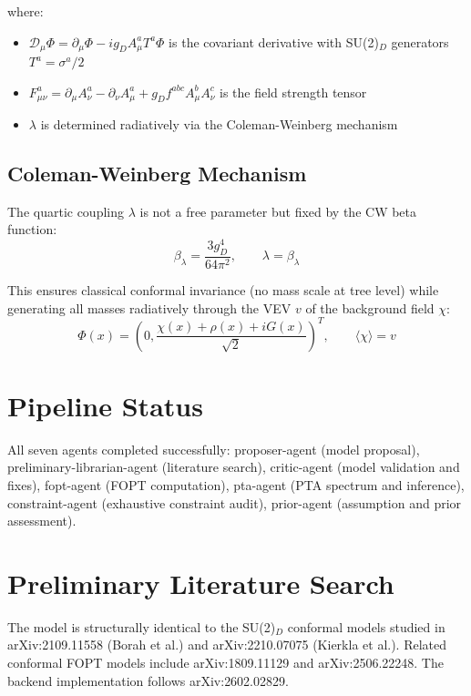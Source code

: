 \documentclass[11pt,a4paper,oneside]{article}
\begin{document}
\noindent where:
\begin{itemize}
\item $ \mathcal{D}_\mu \Phi = \partial_\mu \Phi - i g_D A^a_\mu T^a \Phi $ is the covariant derivative with SU(2)$_D$ generators $T^a = \sigma^a / 2$
\item $ F^a_{\mu \nu} = \partial_\mu A^a_\nu - \partial_\nu A^a_\mu + g_D f^{abc} A^b_\mu A^c_\nu $ is the field strength tensor
\item $ \lambda $ is determined radiatively via the Coleman-Weinberg mechanism
\end{itemize}

\subsection{Coleman-Weinberg Mechanism}
The quartic coupling $\lambda$ is not a free parameter but fixed by the CW beta function:
\begin{equation*}
\beta_\lambda = \frac{3 g_D^4}{64 \pi^2}, \qquad \lambda = \beta_\lambda
\end{equation*}

This ensures classical conformal invariance (no mass scale at tree level) while generating all masses radiatively through the VEV $v$ of the background field $\chi$:
\begin{equation*}
\Phi(x) = \left(0, \frac{\chi(x) + \rho(x) + i G(x)}{\sqrt{2}}\right)^T, \qquad \langle \chi \rangle = v
\end{equation*}

\section{Pipeline Status}
All seven agents completed successfully: proposer-agent (model proposal), preliminary-librarian-agent (literature search), critic-agent (model validation and fixes), fopt-agent (FOPT computation), pta-agent (PTA spectrum and inference), constraint-agent (exhaustive constraint audit), prior-agent (assumption and prior assessment).

\section{Preliminary Literature Search}
The model is structurally identical to the SU(2)$_D$ conformal models studied in arXiv:2109.11558 (Borah et al.) and arXiv:2210.07075 (Kierkla et al.). Related conformal FOPT models include arXiv:1809.11129 and arXiv:2506.22248. The backend implementation follows arXiv:2602.02829.
\end{document}

